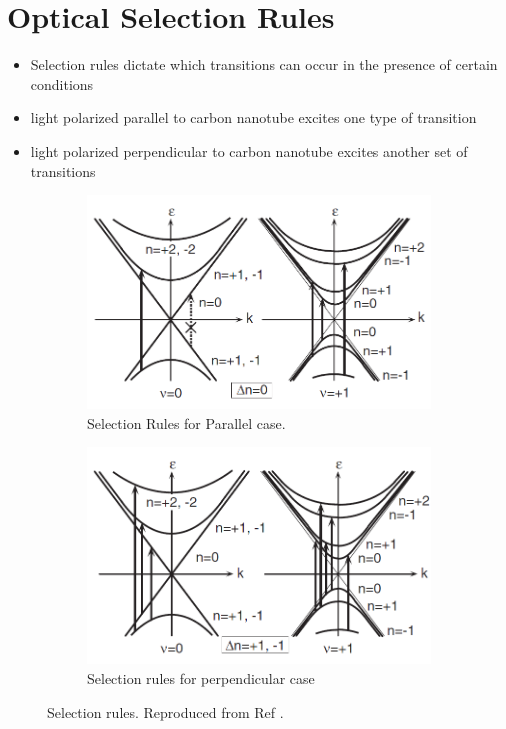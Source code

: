 \section{Optical Selection Rules}
\begin{itemize}
	\item Selection rules dictate which transitions can occur in the presence of certain conditions
	\item light polarized parallel to carbon nanotube excites one type of transition
	\item light polarized perpendicular to carbon nanotube excites another set of transitions
\end{itemize}

\begin{figure}[H]
	\centering
	\begin{subfigure}{\textwidth}
		\centering
		\includegraphics[scale=0.7]{images/chapter_optical_props/selection_rules_1.png}
		\caption{Selection Rules for Parallel case.}
	\end{subfigure}
	\begin{subfigure}{\textwidth}
		\centering
		\includegraphics[scale=0.7]{images/chapter_optical_props/selection_rules_2.png}
		\caption{Selection rules for perpendicular case}
	\end{subfigure}
	\caption{Selection rules. Reproduced from Ref \cite{ando2005theory}.}
	\label{fig:selection_rules}
\end{figure}

